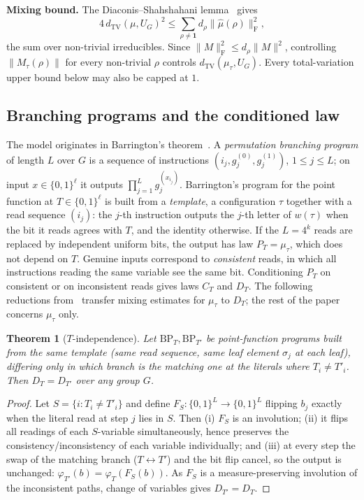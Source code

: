 \documentclass[11pt]{amsart}
\newtheorem{theorem}{Theorem}[section]
\theoremstyle{definition}
\theoremstyle{remark}
\theoremstyle{plain}
\theoremstyle{plain}
\numberwithin{equation}{section}
\newcommand{\parhead}[1]{\par\smallskip\noindent\textbf{#1}\enspace}
\newcommand{\norm}[1]{\lVert #1 \rVert}
\newcommand{\frob}[1]{\norm{#1}_{\mathrm{F}}}
\newcommand{\opn}[1]{\norm{#1}}
\newcommand{\dtv}{d_{\mathrm{TV}}}
\newcommand{\BP}{\mathrm{BP}}
\begin{document}
\parhead{Mixing bound.}
The Diaconis--Shahshahani lemma~\cite{DS81} gives
\[
4\,\dtv(\mu,U_G)^2\le\sum_{\rho\neq\mathbf 1}d_\rho\frob{\widehat\mu(\rho)}^2,
\]
the sum over non-trivial irreducibles. Since $\frob{M}^2\le d_\rho\opn{M}^2$,
controlling $\opn{M_\tau(\rho)}$ for every non-trivial $\rho$ controls
$\dtv(\mu_\tau,U_G)$. Every total-variation upper bound below may also
be capped at $1$.

\subsection{Branching programs and the conditioned law}
\label{sec:tindep}
\label{sec:conditioning}

The model originates in Barrington's theorem~\cite{Bar89}. A
\emph{permutation branching program} of length $L$ over $G$ is a
sequence of instructions $(i_j,g_j^{(0)},g_j^{(1)})$, $1\le j\le L$; on
input $x\in\{0,1\}^\ell$ it outputs $\prod_{j=1}^L g_j^{(x_{i_j})}$.
Barrington's program for the point function at $T\in\{0,1\}^\ell$ is
built from a \emph{template}, a configuration $\tau$ together with a
read sequence $(i_j)$: the $j$-th instruction outputs the $j$-th letter
of $w(\tau)$ when the bit it reads agrees with $T$, and the identity
otherwise. If the $L=4^k$ reads are replaced by independent uniform
bits, the output has law $P_T=\mu_\tau$, which does not depend on $T$.
Genuine inputs correspond to \emph{consistent} reads, in which all
instructions reading the same variable see the same bit. Conditioning
$P_T$ on consistent or on inconsistent reads gives laws $C_T$ and $D_T$.
The following reductions
from~\cite[Theorem~3 and Lemma~1]{ZermenoS5} transfer mixing estimates
for $\mu_\tau$ to $D_T$; the rest of the paper concerns $\mu_\tau$ only.

\begin{theorem}[$T$-independence]
\label{thm:tindep}
Let $\BP_T,\BP_{T'}$ be point-function programs built from the same template (same read
sequence, same leaf element $\sigma_j$ at each leaf), differing only in which branch is
the matching one at the literals where $T_i\neq T'_i$. Then $D_T=D_{T'}$ over any group
$G$.
\end{theorem}

\begin{proof}
Let $S=\{i:T_i\neq T'_i\}$ and define $F_S:\{0,1\}^L\to\{0,1\}^L$ flipping $b_j$ exactly
when the literal read at step $j$ lies in $S$. Then (i) $F_S$ is an involution; (ii) it
flips all readings of each $S$-variable simultaneously, hence preserves the
consistency/inconsistency of each variable individually; and (iii) at every step the
swap of the matching branch ($T\!\leftrightarrow\!T'$) and the bit flip cancel, so the
output is unchanged: $\varphi_{T'}(b)=\varphi_T(F_S(b))$. As $F_S$ is a measure-preserving
involution of the inconsistent paths, change of variables gives $D_{T'}=D_T$.
\end{proof}
\end{document}
